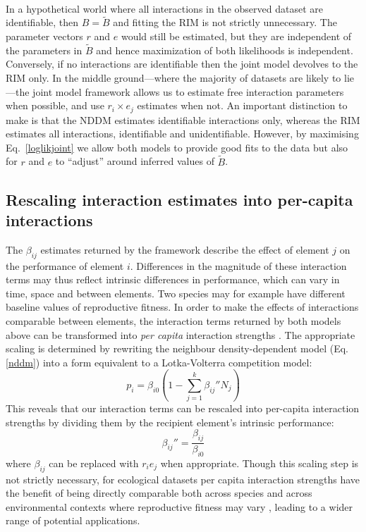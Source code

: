 \documentclass[a4,12pt]{article}
\begin{document}
    \paragraph{}
    In a hypothetical world where all interactions in the observed dataset are identifiable, then $B = \tilde B$ and fitting the RIM is not strictly unnecessary. The parameter vectors $r$ and $e$ would still be estimated, but they are independent of the parameters in $\tilde B$ and hence maximization of both likelihoods is independent. Conversely, if no interactions are identifiable then the joint model devolves to the RIM only. In the middle ground---where the majority of datasets are likely to lie---the joint model framework allows us to estimate free interaction parameters when possible, and use $r_i \times e_j$ estimates when not.  An important distinction to make is that the NDDM estimates identifiable interactions only, whereas the RIM estimates all interactions, identifiable and unidentifiable. However, by maximising Eq.~\ref{loglikjoint} we allow both models to provide good fits to the data but also for $r$ and $e$ to ``adjust'' around inferred values of $\tilde B$. 


    \subsection{Rescaling interaction estimates into per-capita interactions}

        The $\beta_{ij}$ estimates returned by the framework describe the effect of element $j$ on the performance of element $i$. Differences in the magnitude of these interaction terms may thus reflect intrinsic differences in performance, which can vary in time, space and between elements. Two species may for example have different baseline values of reproductive fitness. In order to make the effects of interactions comparable between elements, the interaction terms returned by both models above can be transformed into \textit{per capita} interaction strengths \parencite{Laska1998}. The appropriate scaling is determined by rewriting the neighbour density-dependent model (Eq. \ref{nddm}) into a form equivalent to a Lotka-Volterra competition model: 
        \begin{equation}
        p_{i} = \beta_{i0} \left ( 1 - \sum_{j=1}^{k} {\beta_{ij}}'' N_{j} \right )
        \label{LVform}
        \end{equation}
        This reveals that our interaction terms can be rescaled into per-capita interaction strengths by dividing them by the recipient element's intrinsic performance:  
        \begin{equation}
        {\beta_{ij}}'' = \frac{\beta_{ij}}{\beta_{i0}}
        \label{scaling}
        \end{equation}
        where $\beta_{ij}$ can be replaced with $r_i e_j$ when appropriate. Though this scaling step is not strictly necessary, for ecological datasets per capita interaction strengths have the benefit of being directly comparable both across species and across environmental contexts where reproductive fitness may vary \parencite{Wootton2005}, leading to a wider range of potential applications.
\end{document}
